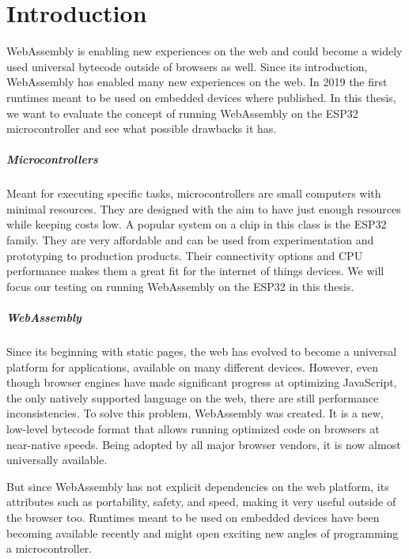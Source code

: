 
\chapter{Introduction}\label{chapter:introduction}

WebAssembly is enabling new experiences on the web and could become a widely used universal bytecode outside of browsers as well. Since its introduction, WebAssembly has enabled many new experiences on the web. In 2019 the first runtimes meant to be used on embedded devices where published. In this thesis, we want to evaluate the concept of running WebAssembly on the ESP32 microcontroller and see what possible drawbacks it has.

\paragraph{Microcontrollers}
Meant for executing specific tasks, microcontrollers are small computers with minimal resources. They are designed with the aim to have just enough resources while keeping costs low. A popular system on a chip in this class is the ESP32 family. They are very affordable and can be used from experimentation and prototyping to production products. Their connectivity options and CPU performance makes them a great fit for the internet of things devices. We will focus our testing on running WebAssembly on the ESP32 in this thesis.

\paragraph{WebAssembly}
Since its beginning with static pages, the web has evolved to become a universal platform for applications, available on many different devices. However, even though browser engines have made significant progress at optimizing JavaScript, the only natively supported language on the web, there are still performance inconsistencies. To solve this problem, WebAssembly was created. It is a new, low-level bytecode format that allows running optimized code on browsers at near-native speeds. Being adopted by all major browser vendors, it is now almost universally available.

But since WebAssembly has not explicit dependencies on the web platform, its attributes such as portability, safety, and speed, making it very useful outside of the browser too. Runtimes meant to be used on embedded devices have been becoming available recently and might open exciting new angles of programming a microcontroller.

